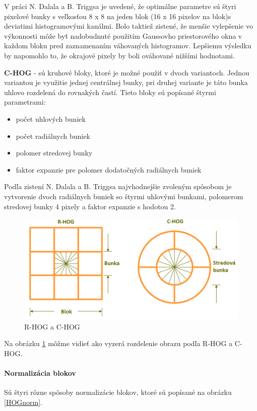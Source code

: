 V práci N. Dalala a B. Triggsa je uvedené, že optimálne parametre sú štyri pixelové bunky s veľkosťou  8 x 8 na jeden blok (16 x 16 pixelov na blok)s deviatimi histogramovými kanálmi. Bolo taktiež zistené, že menšie vylepšenie vo výkonnosti môže byť nadobudnuté použitím Gaussovho priestorového okna v každom bloku pred zaznamenaním váhovaných histogramov. Lepšiemu výsledku by napomohlo to, že okrajové pixely by boli ováhované nižšími hodnotami. 

\textbf{C-HOG} - sú kruhové bloky, ktoré je možné použiť v dvoch variantoch. Jednou variantou je využitie jednej centrálnej bunky, pri druhej variante je táto bunka uhlovo rozdelená do rovnakých častí. Tieto bloky sú popísané štyrmi parametrami:

\begin{itemize}
\item počet uhlových buniek
\item počet radiálnych buniek
\item polomer stredovej bunky
\item faktor expanzie pre polomer dodatočných radiálnych buniek
\end{itemize}

Podľa zistení N. Dalala a B. Triggsa najvhodnejšie zvoleným spôsobom je vytvorenie dvoch radiálnych buniek so štyrmi uhlovými bunkami, polomerom stredovej bunky 4 pixely a faktor expanzie s hodotou 2. 


\begin{figure}[!htbp]
  \centering
  \includegraphics[width=14cm]{img/HOGimg.png}
  \caption{R-HOG a C-HOG}
  \label{HOGimg}
\end{figure}

Na obrázku \ref{HOGimg} môžme vidieť ako vyzerá rozdelenie obrazu podľa R-HOG a C-HOG.

\paragraph{Normalizácia blokov}
Sú štyri rôzne spôsoby normalizácie blokov, ktoré sú popísané na obrázku \ref{HOGnorm}.

